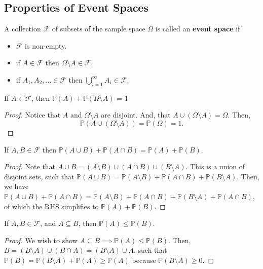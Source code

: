 
\subsection{Properties of Event Spaces}

\begin{definition}
	A collection \( \mathcal{F} \) of subsets of the sample space \( \Omega  \) is called an \textbf{event space} if 
	\begin{itemize}
		\item \( \mathcal{F} \) is non-empty.
		\item if \( A \in \mathcal{F} \) then \( \Omega \setminus A \in \mathcal{F} \).
		\item if \( A_{1},A_{2},\ldots \in \mathcal{F} \) then \( \bigcup_{i=1}^{\infty}A_i \in \mathcal{F} \).
	\end{itemize}
\end{definition}

\begin{theorem}
	If \( A \in \mathcal{F} \), then \( \mathbb{P}(A) + \mathbb{P}(\Omega \setminus A) \) = 1
\end{theorem}
\begin{proof}
	Notice that \( A \) and \( \Omega  \setminus  A \) are disjoint. And, that \( A \cup (\Omega  \setminus A) = \Omega \). Then,	\[
		\mathbb{P}(A \cup (\Omega \setminus A)) = \mathbb{P}(\Omega ) = 1
	.\] 
\end{proof}

\begin{theorem}
	If \( A,B \in \mathcal{F} \) then \( \mathbb{P}(A \cup B) + \mathbb{P}(A \cap B) = \mathbb{P}(A) + \mathbb{P}(B)\).
\end{theorem}
\begin{proof}
	Note that \( A \cup B = (A \setminus B) \cup (A \cap B) \cup (B \setminus A) \). This is a union of disjoint sets, such that \( \mathbb{P}(A \cup B) = \mathbb{P}(A \setminus B) + \mathbb{P}(A \cap B) + \mathbb{P}(B \setminus A) \). Then, we have \( \mathbb{P}(A \cup B) + \mathbb{P}(A \cap B) = \mathbb{P}(A \setminus B) + \mathbb{P}(A \cap B) + \mathbb{P}(B \setminus A) + \mathbb{P}(A \cap B)\), of which the RHS simplifies to \( \mathbb{P}(A) + \mathbb{P}(B) \).
\end{proof}

\begin{theorem}
	If \( A, B \in \mathcal{F} \), and \( A \subseteq B \), then \( \mathbb{P}(A) \le  \mathbb{P}(B) \).
\end{theorem}
\begin{proof}
	We wish to show \( A \subseteq B \implies \mathbb{P}(A) \le \mathbb{P}(B) \). Then, \( B = (B \setminus A) \cup  (B \cap A) = (B \setminus A) \cup  A \), such that \( \mathbb{P}(B) = \mathbb{P}(B \setminus A) + \mathbb{P}(A) \ge \mathbb{P}(A)\) because \( \mathbb{P}(B \setminus A) \ge  0 \).
\end{proof}

